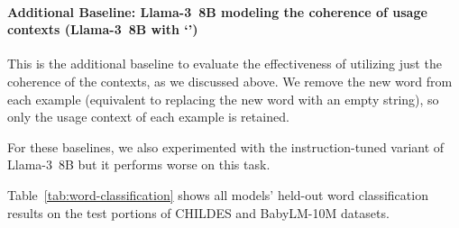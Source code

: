 \documentclass{article}
\begin{document}
\paragraph{Additional Baseline: \mbox{Llama-3 8B} modeling the coherence of usage contexts (\mbox{Llama-3 8B} with `')}
This is the additional baseline to evaluate the effectiveness of utilizing just the coherence of the contexts, as we discussed above. We remove the new word from each example (equivalent to replacing the new word with an empty string), so only the usage context of each example is retained.

For these baselines, we also experimented with the instruction-tuned variant of \mbox{Llama-3 8B} but it performs worse on this task.

Table~\ref{tab:word-classification} shows all models' held-out word classification results on the test portions of CHILDES and BabyLM-10M datasets.
\end{document}
